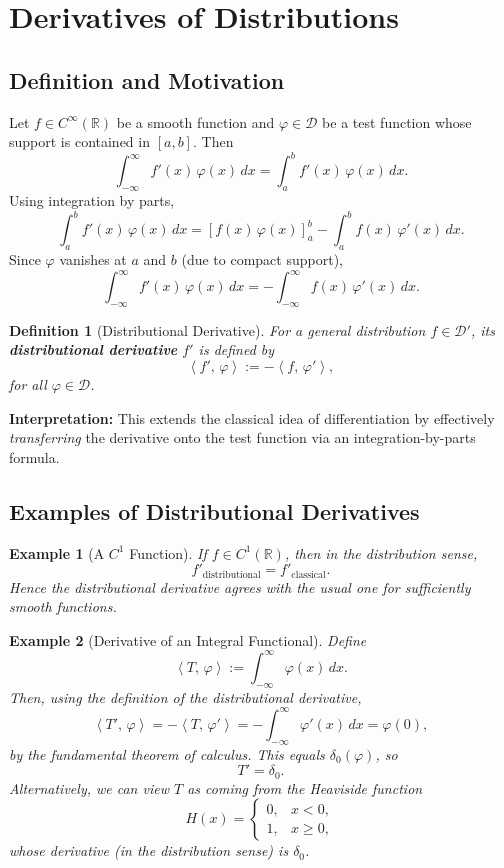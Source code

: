 \documentclass[11pt,openany]{book}
\newcommand{\dist}[2]{\left\langle #1,\, #2 \right\rangle}
\newtheorem{definition}{Definition}[section]
\newtheorem{example}{Example}[section]
\begin{document}
\section{Derivatives of Distributions}

\subsection{Definition and Motivation}

Let $f \in C^\infty(\mathbb{R})$ be a smooth function and $\varphi \in \mathcal{D}$ be a test function whose support is contained in $[a,b]$. Then
\[
\int_{-\infty}^{\infty} f'(x)\,\varphi(x)\,dx
= \int_{a}^{b} f'(x)\,\varphi(x)\,dx.
\]
Using integration by parts,
\[
\int_{a}^{b} f'(x)\,\varphi(x)\,dx
= \left[ f(x)\,\varphi(x) \right]_{a}^{b} - \int_{a}^{b} f(x)\,\varphi'(x)\,dx.
\]
Since $\varphi$ vanishes at $a$ and $b$ (due to compact support),
\[
\int_{-\infty}^{\infty} f'(x)\,\varphi(x)\,dx
= -\int_{-\infty}^{\infty} f(x)\,\varphi'(x)\,dx.
\]
\begin{definition}[Distributional Derivative]
For a general distribution $f \in \mathcal{D}'$, its \textbf{distributional derivative} $f'$ is defined by
\[
\dist{f'}{\varphi} := -\dist{f}{\varphi'},
\]
for all $\varphi \in \mathcal{D}$.
\end{definition}

\noindent
\textbf{Interpretation:}
This extends the classical idea of differentiation by effectively \emph{transferring} the derivative onto the test function via an integration-by-parts formula.

\subsection{Examples of Distributional Derivatives}

\begin{example}[A $C^1$ Function]
If $f \in C^1(\mathbb{R})$, then in the distribution sense,
\[
f'_\text{distributional} = f'_\text{classical}.
\]
Hence the distributional derivative agrees with the usual one for sufficiently smooth functions.
\end{example}

\begin{example}[Derivative of an Integral Functional]
Define
\[
\dist{T}{\varphi} := \int_{-\infty}^{\infty} \varphi(x)\,dx.
\]
Then, using the definition of the distributional derivative,
\[
\dist{T'}{\varphi}
= -\dist{T}{\varphi'}
= -\int_{-\infty}^{\infty} \varphi'(x)\,dx
= \varphi(0),
\]
by the fundamental theorem of calculus. This equals $\delta_0(\varphi)$, so
\[
T' = \delta_0.
\]
Alternatively, we can view $T$ as coming from the \emph{Heaviside function}
\[
H(x) =
\begin{cases}
0, & x < 0, \\
1, & x \ge 0,
\end{cases}
\]
whose derivative (in the distribution sense) is $\delta_0$.
\end{example}
\end{document}
